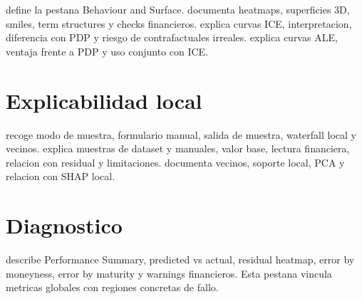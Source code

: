  define la pestana Behaviour and Surface.  documenta heatmaps, superficies 3D, smiles, term structures y checks financieros.  explica curvas ICE, interpretacion, diferencia con PDP y riesgo de contrafactuales irreales.  explica curvas ALE, ventaja frente a PDP y uso conjunto con ICE.

\section{Explicabilidad local}

 recoge modo de muestra, formulario manual, salida de muestra, waterfall local y vecinos.  explica muestras de dataset y manuales, valor base, lectura financiera, relacion con residual y limitaciones.  documenta vecinos, soporte local, PCA y relacion con SHAP local.

\section{Diagnostico}

 describe Performance Summary, predicted vs actual, residual heatmap, error by moneyness, error by maturity y warnings financieros. Esta pestana vincula metricas globales con regiones concretas de fallo.
